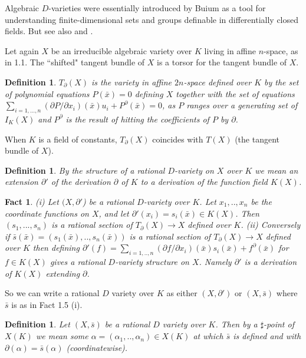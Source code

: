 \documentclass[12pt]{article}
\newtheorem{Definition}[Theorem]{Definition}
\newtheorem{Fact}[Theorem]{Fact}
\begin{document}
Algebraic $D$-varieties were essentially introduced by Buium \cite{Buium} as a tool for understanding finite-dimensional sets  and groups definable in differentially closed fields. But see also \cite{Pillay-Ziegler} and \cite{Pillay-Tehran}.

Let again $X$ be an irreducible algebraic variety over $K$ living in affine $n$-space,  as in 1.1.  The ``shifted" tangent bundle of $X$ is a torsor for the tangent bundle of $X$.
\begin{Definition} $T_{\partial}(X)$ is the variety in affine $2n$-space defined  over $K$  by the set of polynomial equations $P({\bar x}) = 0$ defining $X$ together with
the set of equations  $\sum_{i=1,...,n} (\partial P/\partial x_{i})({\bar x})u_{i} +  P^{\partial}({\bar x}) = 0$, as $P$ ranges over a generating set of $I_{K}(X)$ and $P^{\partial}$ is the result of hitting the coefficients of $P$ by $\partial$.
\end{Definition} 

When $K$ is a field of constants, $T_{\partial}(X)$ coincides with $T(X)$ (the tangent bundle of $X$). 



\begin{Definition} 
By the structure of a rational $D$-variety on $X$ over $K$ we mean an extension $\partial '$ of  the derivation $\partial$ of $K$  to a derivation of the function field $K(X)$.
\end{Definition}

\begin{Fact} (i) Let $(X,\partial '$) be a rational $D$-variety over $K$.  Let $x_{1},..,x_{n}$ be the coordinate functions on $X$, and let $\partial ' (x_{i}) = s_{i}({\bar x}) \in K(X)$. Then 
$(s_{1},...,s_{n})$ is a rational section of $T_{\partial}(X) \to X$ defined over $K$. 
\newline
(ii) Conversely if ${\bar s}({\bar x}) = (s_{1}({\bar x}),..,s_{n}({\bar x}))$ is a rational section of $T_{\partial}(X) \to X$ defined over $K$ then defining $\partial ' (f) = \sum_{i=1,..,n}(\partial f/\partial x_{i})({\bar x})s_{i}({\bar x}) + f^{\partial}({\bar x})$  for $f\in K(X)$ gives a rational $D$-variety structure on $X$. Namely $\partial '$ is a derivation of $K(X)$ extending $\partial$. 
\end{Fact} 

So we can write a rational $D$ variety over $K$ as either $(X,\partial')$ or $(X,{\bar s})$ where ${\bar s}$ is as in Fact 1.5 (i). 

\begin{Definition}  Let $(X,{\bar s})$ be a rational $D$ variety over $K$. Then by a $\sharp$-point of $X(K)$ we mean some $\alpha = (\alpha_{1},..,\alpha_{n})\in X(K)$ at which ${\bar s}$ is defined and with $\partial (\alpha) = {\bar s}(\alpha)$ (coordinatewise). 
\end{Definition}
\end{document}
